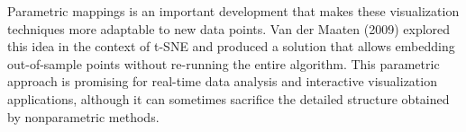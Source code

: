 Parametric mappings is an important development that makes these visualization techniques more adaptable to new data points. Van der Maaten (2009) \cite{van2009learning} explored this idea in the context of t-SNE and produced a solution that allows embedding out-of-sample points without re-running the entire algorithm. This parametric approach is promising for real-time data analysis and interactive visualization applications, although it can sometimes sacrifice the detailed structure obtained by nonparametric methods.